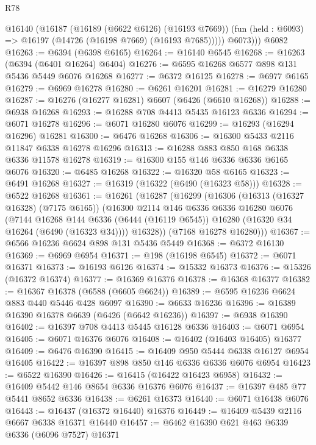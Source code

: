 \begin{lexlean}{R78}
\begin{coremodule}
        @16140
          (@16187
            (@16189 (@6622 @6126) (@16193 @7669))
            (fun (held : @6093) => @16197 (@14726 (@16198 @7669) (@16193 @7685)))))
          @6073)))
    @6082
@16263 := @6394 (@6398 @6165)
@16264 := @16140 @6545
@16268 := @16263 (@6394 (@6401 @16264) @6404)
@16276 := @6595 @16268 @6577 @898 @131 @5436 @5449 @6076 @16268
@16277 := @6372 @16125
@16278 := @6977 @6165
@16279 := @6969 @16278
@16280 := @6261 @16201
@16281 := @16279 @16280
@16287 := @16276 (@16277 @16281) @6607 (@6426 (@6610 @16268))
@16288 := @6938 @16268
@16293 := @16288 @708 @4413 @5435 @16123 @6336
@16294 := @6071 @16278
@16296 := @6071 @16280 @6076
@16299 := @16293 (@16294 @16296) @16281
@16300 := @6476 @16268
@16306 := @16300 @5433 @2116 @11847 @6338 @16278 @16296
@16313 := @16288 @883 @850 @168 @6338 @6336 @11578 @16278
@16319 := @16300 @155 @146 @6336 @6336 @6165 @6076
@16320 := @6485 @16268
@16322 := @16320 @58 @6165
@16323 := @6491 @16268
@16327 := @16319 (@16322 (@6490 (@16323 @58)))
@16328 := @6522 @16268
@16361 := @16261
    (@16287
      (@16299
        (@16306
          (@16313 (@16327 @16328) (@7175 @6165))
          (@16300
            @2114
            @146
            @6336
            @6336
            @16280
            @6076
            (@7144
              @16268
              @144
              @6336
              (@6444 (@16119 @6545))
              @16280
              (@16320 @34 @16264 (@6490 (@16323 @34))))
            @16328))
        (@7168 @16278 @16280)))
@16367 := @6566 @16236 @6624 @898 @131 @5436 @5449
@16368 := @6372 @16130
@16369 := @6969 @6954
@16371 := @198 (@16198 @6545)
@16372 := @6071 @16371
@16373 := @16193 @6126
@16374 := @15332 @16373
@16376 := @15326 (@16372 @16374)
@16377 := @16369 @16376
@16378 := @16368 @16377
@16382 := @16367 @16378 (@6588 (@6605 @6624))
@16389 := @6595 @16236 @6624 @883 @440 @5446 @428 @6097
@16390 := @6633 @16236
@16396 := @16389 @16390 @16378 @6639 (@6426 (@6642 @16236))
@16397 := @6938 @16390
@16402 := @16397 @708 @4413 @5445 @16128 @6336
@16403 := @6071 @6954
@16405 := @6071 @16376 @6076
@16408 := @16402 (@16403 @16405) @16377
@16409 := @6476 @16390
@16415 := @16409 @950 @5444 @6338 @16127 @6954 @16405
@16422 := @16397 @898 @850 @146 @6336 @6336 @6076 @6954
@16423 := @6522 @16390
@16426 := @16415 (@16422 @16423 @6958)
@16432 := @16409 @5442 @146 @8654 @6336 @16376 @6076
@16437 := @16397 @485 @77 @5441 @8652 @6336
@16438 := @6261 @16373
@16440 := @6071 @16438 @6076
@16443 := @16437 (@16372 @16440) @16376
@16449 := @16409 @5439 @2116 @6667 @6338 @16371 @16440
@16457 := @6462 @16390 @621 @463 @6339 @6336 (@6096 @7527) @16371

\end{coremodule}
\end{lexlean}
